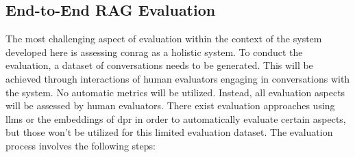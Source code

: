 \subsection{End-to-End RAG Evaluation}
\label{subsec:rag-eval}

The most challenging aspect of evaluation within the context of the system developed here is assessing \gls{conrag} as a holistic system. To conduct the evaluation, a dataset of conversations needs to be generated. This will be achieved through interactions of human evaluators engaging in conversations with the system. No automatic metrics will be utilized. Instead, all evaluation aspects will be assessed by human evaluators. There exist evaluation approaches using \gls{llm}s or the embeddings of \gls{dpr} in order to automatically evaluate certain aspects, but those won't be utilized for this limited evaluation dataset. The evaluation process involves the following steps:

